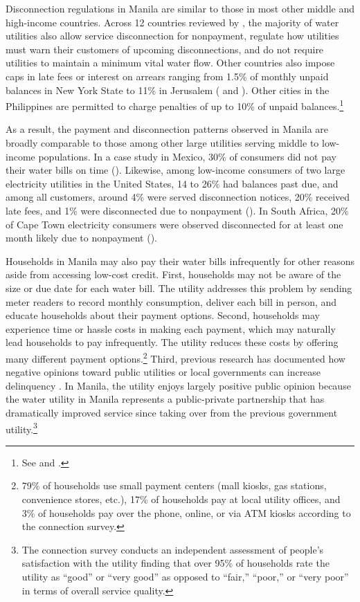\documentclass[12pt]{article}
\begin{document}
Disconnection regulations in Manila are similar to those in most other middle and high-income countries.  Across 12 countries reviewed by \cite{marques2023water}, the majority of water utilities also allow service disconnection for nonpayment, regulate how utilities must warn their customers of upcoming disconnections, and do not require utilities to maintain a minimum vital water flow.  Other countries also impose caps in late fees or interest on arrears ranging from 1.5\% of monthly unpaid balances in New York State to 11\% in Jerusalem (\cite{nycrr_11_15} and \cite{shavit_krause_polemio_2024}).   Other cities in the Philippines are permitted to charge penalties of up to 10\% of unpaid balances.\footnote{See \cite{mnwd_guidelines_bills_payments} and \cite{ppcwater_ur_billing}. }

As a result, the payment and disconnection patterns observed in Manila are broadly comparable to those among other large utilities serving middle to low-income populations.  In a case study in Mexico, 30\% of consumers did not pay their water bills on time (\cite{marques2023water}).  Likewise, among low-income consumers of two large electricity utilities in the United States, 14 to 26\% had balances past due, and among all customers, around 4\% were served disconnection notices, 20\% received late fees, and 1\% were disconnected due to nonpayment (\cite{cicala2021incidence}).  In South Africa, 20\% of Cape Town electricity consumers were observed disconnected for at least one month likely due to nonpayment (\cite{jack2020charging}).  

Households in Manila may also pay their water bills infrequently for other reasons aside from accessing low-cost credit.  First, households may not be aware of the size or due date for each water bill.  The utility addresses this problem by sending meter readers to record monthly consumption, deliver each bill in person, and educate households about their payment options.  Second, households may experience time or hassle costs in making each payment, which may naturally lead households to pay infrequently.  The utility reduces these costs by offering many different payment options.\footnote{79\unskip\% of households use small payment centers (mall kiosks, gas stations, convenience stores, etc.), 17\unskip\% of households pay at local utility offices, and 3\unskip\% of households pay over the phone, online, or via ATM kiosks according to the connection survey.}  Third, previous research has documented how negative opinions toward public utilities or local governments can increase delinquency \citep{szabo2015reducing}.  In Manila, the utility enjoys largely positive public opinion because the water utility in Manila represents a public-private partnership that has dramatically improved service since taking over from the previous government utility.\footnote{The connection survey conducts an independent assessment of people's satisfaction with the utility finding that over 95\% of households rate the utility as ``good'' or ``very good'' as opposed to ``fair,'' ``poor,'' or ``very poor'' in terms of overall service quality.}
\end{document}
